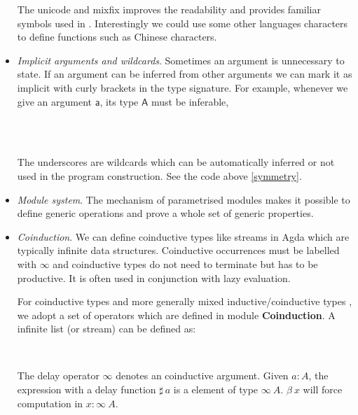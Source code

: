 \begin{itemize}
The unicode and mixfix improves the readability and provides familiar symbols used in \maths.
Interestingly we could use some other languages characters to define functions such as Chinese characters.


\item \textit{Implicit arguments and wildcards}. Sometimes an argument is unnecessary to state. If an argument can be inferred from other arguments we can mark it as implicit with curly brackets in the type signature. For example, whenever we give an argument $\mathsf{a}$,  its type $\mathsf{A}$ must be inferable,

\begin{code}\>\<%
\\
\> \AgdaSymbol{:} \AgdaSymbol{\{} \AgdaSymbol{:} \AgdaSymbol{\}}    \<%
\\
\>  \AgdaSymbol{=} \<%
\end{code}

The underscores are wildcards which can be automatically inferred or not used in the program construction. See the code above \ref{symmetry}.


\item \textit{Module system}. The mechanism of parametrised modules makes it possible to define generic operations and prove a whole set of generic properties.


\item \textit{Coinduction}. We can define coinductive types like streams in Agda which are typically infinite data structures. Coinductive occurrences must be labelled with $\infty$ and coinductive types do not need to terminate but has to be productive. It is often used in conjunction with lazy evaluation. \cite{wiki:Coinduction}

For coinductive types and more generally mixed inductive/coinductive types \cite{txa:mpc2010g}, we adopt a set of operators which are defined in module \textbf{Coinduction}. A infinite list (or stream) can be defined as:

\begin{code}
\>  \AgdaSymbol{(} \AgdaSymbol{:} \AgdaSymbol{)} \AgdaSymbol{:}  \<%
\\
\>[0]\<[2]%
\>[2] \AgdaSymbol{:}    \AgdaSymbol{(} \AgdaSymbol{)}   \<%
\end{code}

The delay operator $\infty$ denotes an coinductive argument. Given $a:A$, the expression with a delay function $\sharp~a$ is a element of type $\infty~A$. $\beta~x$ will force computation in $x : \infty~A$.
	
\end{itemize} 


